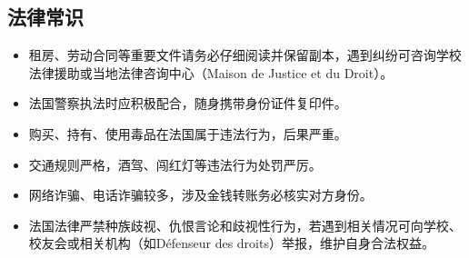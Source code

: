 \subsection{法律常识}

\begin{itemize}
    \item 租房、劳动合同等重要文件请务必仔细阅读并保留副本，遇到纠纷可咨询学校法律援助或当地法律咨询中心（Maison de Justice et du Droit）。
    \item 法国警察执法时应积极配合，随身携带身份证件复印件。
    \item 购买、持有、使用毒品在法国属于违法行为，后果严重。
    \item 交通规则严格，酒驾、闯红灯等违法行为处罚严厉。
    \item 网络诈骗、电话诈骗较多，涉及金钱转账务必核实对方身份。
    \item 法国法律严禁种族歧视、仇恨言论和歧视性行为，若遇到相关情况可向学校、校友会或相关机构（如Défenseur des droits）举报，维护自身合法权益。
\end{itemize}
